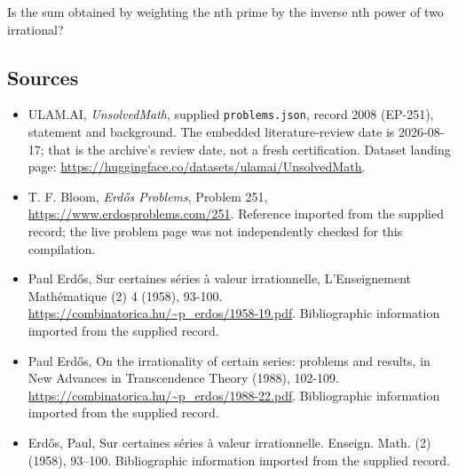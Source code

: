 \documentclass[11pt,a4paper]{article}
\begin{document}
Is the sum obtained by weighting the nth prime by the inverse nth power of two irrational?

\subsection{Sources}

{\small

\begin{itemize}

\item[\hypertarget{source:2008:1}{S1}] ULAM.AI, \emph{UnsolvedMath}, supplied \texttt{problems.json}, record 2008 (EP-251), statement and background. The embedded literature-review date is 2026-08-17; that is the archive’s review date, not a fresh certification. Dataset landing page: \url{https://huggingface.co/datasets/ulamai/UnsolvedMath}.

\item[\hypertarget{source:2008:2}{S2}] T. F. Bloom, \emph{Erdős Problems}, Problem 251, \url{https://www.erdosproblems.com/251}. Reference imported from the supplied record; the live problem page was not independently checked for this compilation.

\item[\hypertarget{source:2008:3}{S3}] Paul Erdős, Sur certaines séries à valeur irrationnelle, L'Enseignement Mathématique (2) 4 (1958), 93-100. \url{https://combinatorica.hu/~p_erdos/1958-19.pdf}. Bibliographic information imported from the supplied record.

\item[\hypertarget{source:2008:4}{S4}] Paul Erdős, On the irrationality of certain series: problems and results, in New Advances in Transcendence Theory (1988), 102-109. \url{https://combinatorica.hu/~p_erdos/1988-22.pdf}. Bibliographic information imported from the supplied record.

\item[\hypertarget{source:2008:5}{S5}] Erd\H{o}s, Paul, Sur certaines s\'{e}ries \`a{} valeur irrationnelle. Enseign. Math. (2) (1958), 93--100. Bibliographic information imported from the supplied record.

\end{itemize}

}

\label{end:2008}
\end{document}
